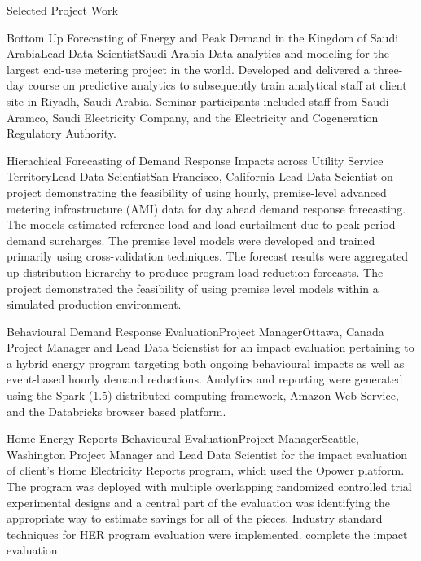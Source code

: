 \documentclass{resume} %
\begin{document}
	\begin{rSection}{Selected Project Work}
	
	\begin{rSubsection}{Bottom Up Forecasting of Energy and Peak Demand in the Kingdom of Saudi Arabia}{}{Lead Data Scientist}{Saudi Arabia}
	Data analytics and modeling for the largest end-use metering project in the world. Developed and delivered a three-day course on predictive analytics to subsequently train analytical staff at client site in Riyadh, Saudi Arabia. Seminar participants included staff from Saudi Aramco, Saudi Electricity Company, and the Electricity and Cogeneration Regulatory Authority. 
	
	\end{rSubsection}
	
	\begin{rSubsection}{Hierachical Forecasting of Demand Response Impacts across Utility Service Territory}{}{Lead Data Scientist}{San Francisco, California}
	Lead Data Scientist on project demonstrating the feasibility of using hourly, premise-level advanced metering infrastructure (AMI) data for day ahead demand response forecasting. The models estimated reference load and load curtailment due to peak period demand surcharges. The premise level models were developed and trained primarily using cross-validation techniques. The forecast results were aggregated up distribution hierarchy to produce program load reduction forecasts. The project demonstrated the feasibility of using premise level models within a simulated production environment.
	\end{rSubsection}
	
	\begin{rSubsection}{Behavioural Demand Response Evaluation}{}{Project Manager}{Ottawa, Canada}
	Project Manager and Lead Data Scienstist for an impact evaluation pertaining to a hybrid energy program targeting both ongoing behavioural impacts as well as event-based hourly demand reductions. Analytics and reporting were generated using the Spark (1.5) distributed computing framework, Amazon Web Service, and the Databricks browser based platform. 
	\end{rSubsection}
	
	\begin{rSubsection}{Home Energy Reports Behavioural Evaluation}{}{Project Manager}{Seattle, Washington}
Project Manager and Lead Data Scientist for the impact evaluation of client's Home Electricity Reports program, which used the Opower platform. The program was deployed with multiple overlapping randomized controlled trial experimental designs and a central part of the evaluation was identifying the appropriate way to estimate savings for all of the pieces.   Industry standard techniques for HER program evaluation were implemented. complete the impact evaluation.
	\end{rSubsection}  
	

\end{rSection}
\end{document}
